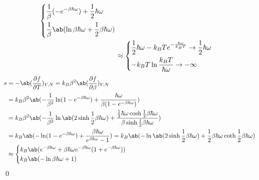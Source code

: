 \documentclass[uplatex,diffipdfmx,a4paper,11pt]{jlreq}
\makeatletter
\theoremstyle{definition}
\renewenvironment{proof}[1][\proofname]{\par
  \normalfont
  \topsep6\p@\@plus6\p@ \trivlist
  \item[\hskip\labelsep{\bfseries #1}\@addpunct{\bfseries}]\ignorespaces\quad\par
}{%
  \qed\endtrivlist\@endpefalse
}
\renewcommand\proofname{証明}
\makeatother
\begin{document}
\begin{proof}
\begin{align}
\begin{dcases}
                  \frac{1}{\beta}(-e^{-\beta\hbar\omega}) + \frac{1}{2}\hbar\omega       \\
                  \frac{1}{\beta}\ab(\ln \beta\hbar\omega + \frac{1}{2}\beta\hbar\omega) \\
                \end{dcases}                                                                                    \\
      & \approx \begin{dcases}
                  \frac{1}{2}\hbar\omega - k_BTe^{-\frac{\hbar\omega}{k_BT}} \to \frac{1}{2}\hbar\omega \\
                  -k_BT\ln\frac{k_BT}{\hbar\omega} \to - \infty                                         \\
                \end{dcases}
  \end{align}
  \begin{align}
    s & = - \ab(\diffp{f}{T})_{V,N} = k_B\beta^2\ab(\diffp{f}{\beta})_{V,N}                                                                                                                                              \\
      & = k_B\beta^2\ab(-\frac{1}{\beta^2}\ln(1 - e^{-\beta\hbar\omega}) + \frac{\hbar\omega}{\beta(1 - e^{-\beta\hbar\omega})})                                                                                         \\
      & = k_B\beta^2\ab(-\frac{1}{\beta^2}\ln\ab(2\sinh \frac{1}{2}\beta\hbar\omega) + \frac{\frac{1}{2}\hbar\omega\cosh \frac{1}{2}\beta\hbar\omega}{\beta\sinh \frac{1}{2}\beta\hbar\omega})                           \\
      & = k_B\ab(-\ln(1 - e^{-\beta\hbar\omega}) + \frac{\beta\hbar\omega}{e^{\beta\hbar\omega} - 1}) = k_B\ab(-\ln\ab(2\sinh\frac{1}{2}\beta\hbar\omega) + \frac{1}{2}\beta\hbar\omega\coth\frac{1}{2}\beta\hbar\omega) \\
      & \approx \begin{dcases}
                  k_B\ab(e^{-\beta\hbar\omega} + \beta\hbar\omega e^{-\beta\hbar\omega}(1 + e^{-\beta\hbar\omega})) \\
                  k_B\ab(-\ln\beta\hbar\omega + 1)                                                                  \\
                \end{dcases}                                                                                                        \\

\end{align}
\end{proof}
\end{document}
